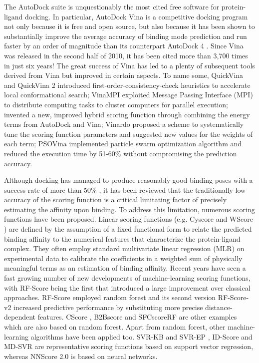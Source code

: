 \documentclass[a4paper,12pt]{article}
\begin{document}
The AutoDock suite \citep{1730} is unquestionably the most cited free software for protein-ligand docking. In particular, AutoDock Vina \citep{595} is a competitive docking program not only because it is free and open source, but also because it has been shown to substantially improve the average accuracy of binding mode prediction and run faster by an order of magnitude than its counterpart AutoDock 4 \citep{596}. Since Vina was released in the second half of 2010, it has been cited more than 3,700 times in just six years! The great success of Vina has led to a plenty of subsequent tools derived from Vina but improved in certain aspects. To name some, QuickVina \citep{1193} and QuickVina 2 \citep{1664} introduced first-order-consistency-check heuristics to accelerate local conformational search; VinaMPI \citep{1329} exploited Message Passing Interface (MPI) to distribute computing tasks to cluster computers for parallel execution; \citeauthor{1716} \citep{1716} invented a new, improved hybrid scoring function through combining the energy terms from AutoDock and Vina; Vinardo \citep{1741} proposed a scheme to systematically tune the scoring function parameters and suggested new values for the weights of each term; PSOVina \citep{1789} implemented particle swarm optimization algorithm and reduced the execution time by 51-60\% without compromising the prediction accuracy.

Although docking has managed to produce reasonably good binding poses with a success rate of more than 50\% \citep{1362}, it has been reviewed \citep{1695} that the traditionally low accuracy of the scoring function is a critical limitating factor of precisely estimating the affinity upon binding. To address this limitation, numerous scoring functions have been proposed. Linear scoring functions (e.g. Cyscore \citep{1372} and WScore \citep{1736}) are defined by the assumption of a fixed functional form to relate the predicted binding affinity to the numerical features that characterize the protein-ligand complex. They often employ standard multivariate linear regression (MLR) on experimental data to calibrate the coefficients in a weighted sum of physically meaningful terms as an estimation of binding affinity. Recent years have seen a fast growing number of new developments of machine-learning scoring functions, with RF-Score \citep{564} being the first that introduced a large improvement over classical approaches. RF-Score employed random forest and its second version RF-Score-v2 \citep{1370} increased predictive performance by substituting more precise distance-dependent features. CScore \citep{1194}, B2Bscore \citep{1410} and SFCscoreRF \citep{1347} are other examples which are also based on random forest. Apart from random forest, other machine-learning algorithms have been applied too. SVR-KB and SVR-EP \citep{963}, ID-Score \citep{1305} and MD-SVR \citep{1452} are representative scoring functions based on support vector regression, whereas NNScore 2.0 \citep{977} is based on neural networks.
\end{document}
